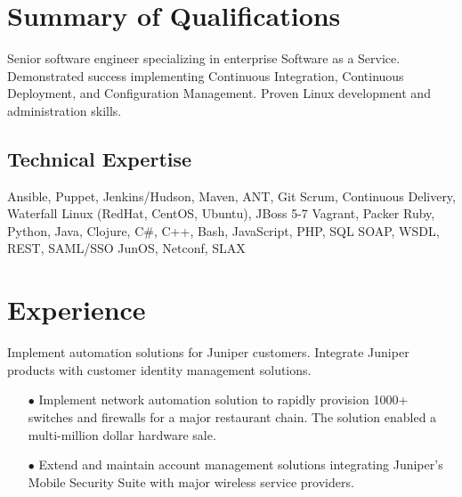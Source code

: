 \documentclass[12pt,letter,roman]{moderncv}
\begin{document}
\makecvtitle

\section{Summary of Qualifications}

Senior software engineer specializing in enterprise Software as a
Service. Demonstrated success implementing Continuous Integration, Continuous
Deployment, and Configuration Management.  Proven Linux development
and administration skills.

\subsection{Technical Expertise}

 { Ansible, Puppet, Jenkins/Hudson,
  Maven, ANT, Git }
 { Scrum, Continuous Delivery, Waterfall }
 { Linux (RedHat, CentOS, Ubuntu), JBoss 5-7 }
 { Vagrant, Packer }
 { Ruby, Python, Java, Clojure, C\#,
  C++, Bash, JavaScript, PHP, SQL }
 { SOAP, WSDL, REST, SAML/SSO }
 { JunOS, Netconf, SLAX }

\section{Experience}


Implement automation solutions for Juniper customers. Integrate
Juniper products with customer identity management solutions.

\begin{itemize}
  \item[$\bullet$] Implement network automation solution to rapidly provision
    1000+ switches and firewalls for a major restaurant chain.  The
    solution enabled a multi-million dollar hardware sale.

  \item[$\bullet$] Extend and maintain account management solutions
    integrating Juniper's Mobile Security Suite with major wireless
    service providers.

\end{itemize}

\vspace{0.5em}
\end{document}

